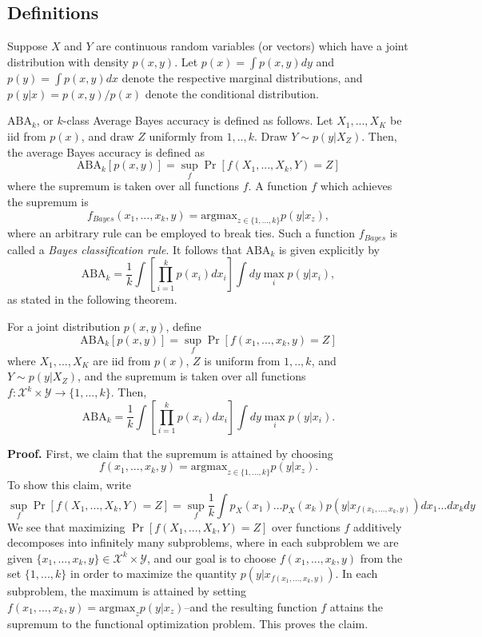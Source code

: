 \subsection{Definitions}
Suppose $X$ and $Y$ are continuous random variables (or vectors) which have a joint distribution with density $p(x, y)$.
Let $p(x) = \int p(x,y) dy$ and $p(y) = \int p(x,y) dx$ denote the respective marginal distributions,
and $p(y|x) = p(x,y)/p(x)$ denote the conditional distribution.

$\text{ABA}_k$, or $k$-class Average Bayes accuracy is defined as follows.  Let $X_1,...,X_K$ be iid from $p(x)$,
and draw $Z$ uniformly from $1,..,k$.  Draw $Y \sim p(y|X_Z)$.
Then, the average Bayes accuracy is defined as
\[
\text{ABA}_k[p(x, y)] = \sup_f \Pr[f(X_1,...,X_k, Y) = Z] 
\]
where the supremum is taken over all functions $f$.  A function $f$ which achieves the supremum is
\[
f_{Bayes}(x_1,...,x_k, y) = \text{argmax}_{z \in \{1,...,k\}} p(y|x_z),
\]
where an arbitrary rule can be employed to break ties.
Such a function $f_{Bayes}$ is called a \emph{Bayes classification rule}.
It follows that $\text{ABA}_k$ is given explicitly by
\[
\text{ABA}_k = \frac{1}{k} \int \left[\prod_{i=1}^k p(x_i) dx_i \right] \int dy \max_i p(y|x_i),
\]
as stated in the following theorem.

\begin{theorem}
For a joint distribution $p(x, y)$, define
\[
\text{ABA}_k[p(x, y)] = \sup_f \Pr[f(x_1,...,x_k, y) = Z] 
\]
where $X_1,...,X_K$ are iid from $p(x)$, $Z$ is uniform from $1,..,k$, and $Y \sim p(y|X_Z)$,
and the supremum is taken over all functions $f: \mathcal{X}^k\times \mathcal{Y} \to \{1,...,k\}$.
Then,
\[
\text{ABA}_k = \frac{1}{k} \int \left[\prod_{i=1}^k p(x_i) dx_i \right] \int dy \max_i p(y|x_i).
\]
\end{theorem}

\noindent\textbf{Proof.}
First, we claim that the supremum is attained by choosing
\[
f(x_1,...,x_k, y) = \text{argmax}_{z \in \{1,...,k\}} p(y|x_z).
\]
To show this claim, write
\[
\sup_f \Pr[f(X_1,...,X_k, Y) = Z] = \sup_f \frac{1}{k}\int p_X(x_1)\hdots p_X(x_k) p(y|x_{f(x_1,...,x_k, y)}) dx_1\hdots dx_k dy
\]
We see that maximizing $\Pr[f(X_1,...,X_k, Y) = Z]$ over functions $f$
additively decomposes into infinitely many subproblems, where in each
subproblem we are given $\{x_1,...,x_k,
y\} \in \mathcal{X}^k \times \mathcal{Y}$, and our goal is to choose
$f(x_1,...,x_k, y)$ from the set $\{1,...,k\}$ in order to maximize
the quantity $p(y|x_{f(x_1,...,x_k, y)})$.  In each subproblem,
the maximum is attained by setting $f(x_1,...,x_k,y) = \text{argmax}_z
p(y|x_z)$--and the resulting function $f$ attains the supremum to the
functional optimization problem.  This proves the claim.

